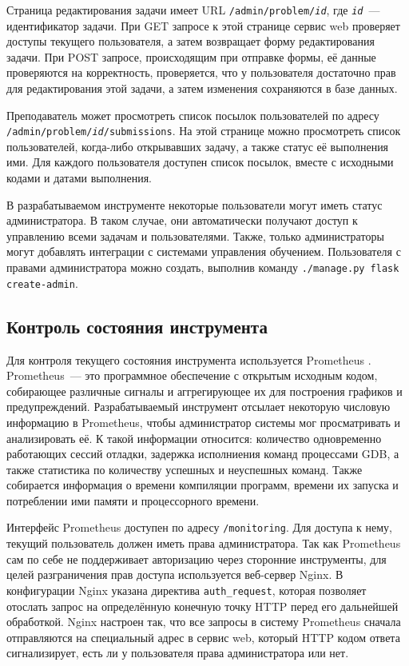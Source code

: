 \documentclass[a4paper,article,14pt]{extarticle}
\begin{document}
Страница редактирования задачи имеет URL \texttt{/admin/problem/\textit{id}}, где \texttt{\textit{id}}~--- идентификатор задачи. При GET запросе к этой странице сервис web проверяет доступы текущего пользователя, а затем возвращает форму редактирования задачи. При POST запросе, происходящим при отправке формы, её данные проверяются на корректность, проверяется, что у пользователя достаточно прав для редактирования этой задачи, а затем изменения сохраняются в базе данных.

Преподаватель может просмотреть список посылок пользователей по адресу \texttt{/admin/problem/\textit{id}/submissions}. На этой странице можно просмотреть список пользователей, когда-либо открывавших задачу, а также статус её выполнения ими. Для каждого пользователя доступен список посылок, вместе с исходными кодами и датами выполнения.

В разрабатываемом инструменте некоторые пользователи могут иметь статус администратора. В таком случае, они автоматически получают доступ к управлению всеми задачам и пользователями. Также, только администраторы могут добавлять интеграции с системами управления обучением. Пользователя с правами администратора можно создать, выполнив команду \texttt{./manage.py flask create-admin}.

\subsection{Контроль состояния инструмента}

Для контроля текущего состояния инструмента используется Prometheus \cite{prometheus}. Prometheus~--- это программное обеспечение с открытым исходным кодом, собирающее различные сигналы и аггрегирующее их для построения графиков и предупреждений. Разрабатываемый инструмент отсылает некоторую числовую информацию в Prometheus, чтобы администратор системы мог просматривать и анализировать её. К такой информации относится: количество одновременно работающих сессий отладки, задержка исполниения команд процессами GDB, а также статистика по количеству успешных и неуспешных команд. Также собирается информация о времени компиляции программ, времени их запуска и потреблении ими памяти и процессорного времени.

Интерфейс Prometheus доступен по адресу \texttt{/monitoring}. Для доступа к нему, текущий пользователь должен иметь права администратора. Так как Prometheus сам по себе не поддерживает авторизацию через сторонние инструменты, для целей разграничения прав доступа используется веб-сервер Nginx. В конфигурации Nginx указана директива \texttt{auth\_request}, которая позволяет отослать запрос на определённую конечную точку HTTP перед его дальнейшей обработкой. Nginx настроен так, что все запросы в систему Prometheus сначала отправляются на специальный адрес в сервис web, который HTTP кодом ответа сигнализирует, есть ли у пользователя права администратора или нет.
\end{document}
